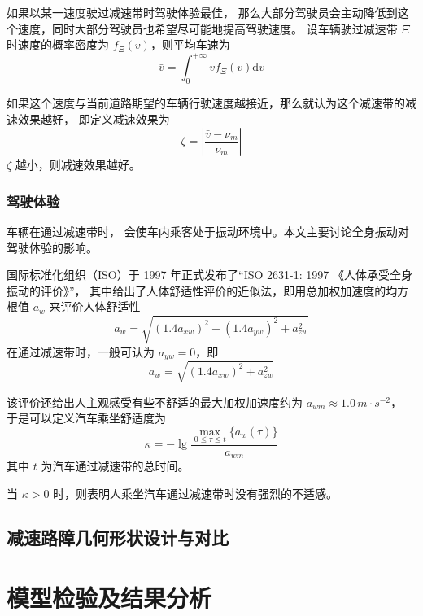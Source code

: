 \documentclass[withoutpreface,bwprint]{cumcmthesis}
\begin{document}
如果以某一速度驶过减速带时驾驶体验最佳，
那么大部分驾驶员会主动降低到这个速度，同时大部分驾驶员也希望尽可能地提高驾驶速度。
设车辆驶过减速带 $\Xi$ 时速度的概率密度为 $f_{\Xi}(v)$，则平均车速为
\begin{equation}
\bar{v} = \int_{0}^{+\infty}{vf_{\Xi}(v)\mathrm{d}v}
\end{equation}

如果这个速度与当前道路期望的车辆行驶速度越接近，那么就认为这个减速带的减速效果越好，
即定义减速效果为
\begin{equation}
\zeta = \left|\frac{\bar{v}-\nu_m}{\nu_m}\right|
\end{equation}
$\zeta$ 越小，则减速效果越好。

\subsubsection{驾驶体验}


车辆在通过减速带时，%
会使车内乘客处于振动环境中。本文主要讨论全身振动对驾驶体验的影响。

国际标准化组织（ISO）于 1997 年正式发布了“ISO 2631-1: 1997 《人体承受全身振动的评价》”，
其中给出了人体舒适性评价的近似法，即用总加权加速度的均方根值 $a_w$ 来评价人体舒适性
\[
    a_w = \sqrt{(1.4a_{xw})^2 + (1.4a_{yw})^2 + a_{zw}^2}
\]
在通过减速带时，一般可认为 $a_{yw} = 0$，即
\begin{equation}
a_w = \sqrt{(1.4a_{xw})^2 + a_{zw}^2}
\end{equation}

该评价还给出人主观感受有些不舒适的最大加权加速度约为 $a_{wm} \approx 1.0\,m\cdot{}s^{-2}$，
于是可以定义汽车乘坐舒适度为
\begin{equation}
\kappa = - \lg{\frac{\displaystyle\max_{0\leq\tau\leq{}t}{\{a_w(\tau)\}}}{a_{wm}}}
\end{equation}
其中 $t$ 为汽车通过减速带的总时间。

当 $\kappa > 0$ 时，则表明人乘坐汽车通过减速带时没有强烈的不适感。

\subsection{减速路障几何形状设计与对比}

\section{模型检验及结果分析}
\end{document}
